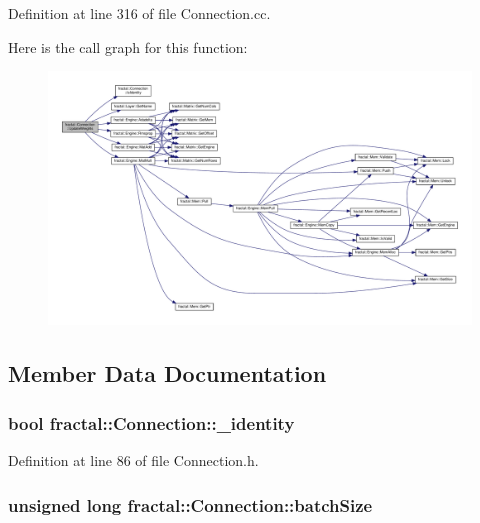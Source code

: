 Definition at line 316 of file Connection.\+cc.



Here is the call graph for this function\+:\nopagebreak
\begin{figure}[H]
\begin{center}
\leavevmode
\includegraphics[width=350pt]{da/dbf/classfractal_1_1Connection_a2b8a12fcdb97fe575d48348ac3e42daa_cgraph}
\end{center}
\end{figure}




\subsection{Member Data Documentation}
\hypertarget{classfractal_1_1Connection_aabe650cd29a9133e18de1a99bafd2069}{
\subsubsection[{\+\_\+identity}]{\setlength{\rightskip}{0pt plus 5cm}bool fractal\+::\+Connection\+::\+\_\+identity\hspace{0.3cm}{\ttfamily [protected]}}}\label{classfractal_1_1Connection_aabe650cd29a9133e18de1a99bafd2069}


Definition at line 86 of file Connection.\+h.

\hypertarget{classfractal_1_1Connection_a1c06df140701c272107c47b4ce40792b}{
\subsubsection[{batch\+Size}]{\setlength{\rightskip}{0pt plus 5cm}unsigned long fractal\+::\+Connection\+::batch\+Size\hspace{0.3cm}{\ttfamily [protected]}}}\label{classfractal_1_1Connection_a1c06df140701c272107c47b4ce40792b}


